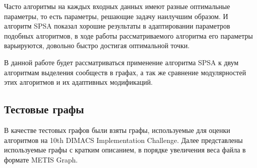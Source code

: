 Часто алгоритмы на каждых входных данных имеют разные оптимальные параметры, то есть параметры, решающие задачу наилучшим образом. И алгоритм SPSA показал хорошие результаты в адаптировании параметров подобных алгоритмов, в ходе работы рассматриваемого алгоритма его параметры варьируются, довольно быстро достигая оптимальной точки.

В данной работе будет рассматриваться применение алгоритма SPSA к двум алгоритмам выделения сообществ в графах, а так же сравнение модулярностей этих алгоритмов и их адаптивных модификаций.



\subsection{Тестовые графы}

В качестве тестовых графов были взяты графы, используемые для оценки алгоритмов на 10th DIMACS Implementation Challenge. Далее представлены используемые графы с кратким описанием, в порядке увеличения веса файла в формате METIS Graph.

